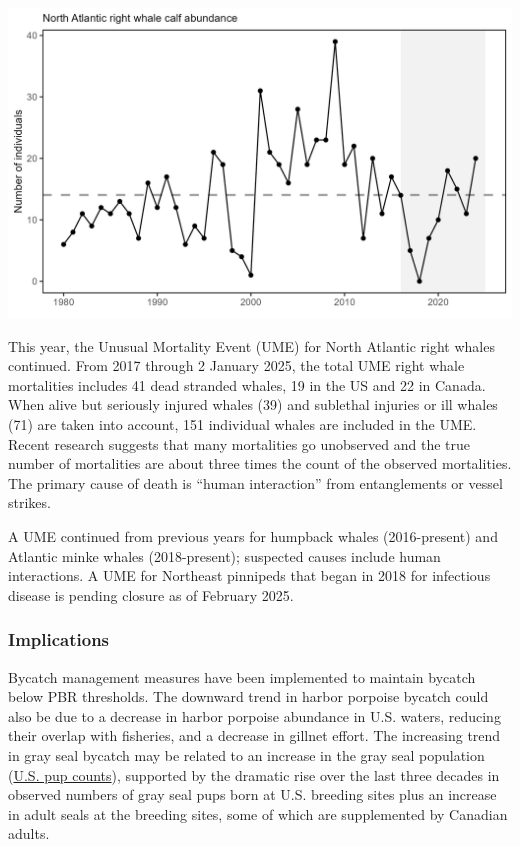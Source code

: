 \documentclass[
  10pt,
]{article}
\let\origfigure\figure
\let\endorigfigure\endfigure
\renewenvironment{figure}[1][2] {
    \expandafter\origfigure\expandafter[H]
} {
    \endorigfigure
}
\begin{document}
\begin{figure}

{\centering \includegraphics[width=6.5in]{images/BothReports/narw_calves_BothReports_2025-09-09} 

}

\caption{Number of North Atlantic right whale calf births, 1990 - 2022.}\label{fig:NARW-calf-abundance}
\end{figure}

This year, the Unusual Mortality Event (UME) for North Atlantic right whales continued. From 2017 through 2 January 2025, the total UME right whale mortalities includes 41 dead stranded whales, 19 in the US and 22 in Canada. When alive but seriously injured whales (39) and sublethal injuries or ill whales (71) are taken into account, 151 individual whales are included in the UME. Recent research suggests that many mortalities go unobserved and the true number of mortalities are about three times the count of the observed mortalities. The primary cause of death is ``human interaction'' from entanglements or vessel strikes.

A UME continued from previous years for humpback whales (2016-present) and Atlantic minke whales (2018-present); suspected causes include human interactions. A UME for Northeast pinnipeds that began in 2018 for infectious disease is pending closure as of February 2025.

\subsubsection{Implications}\label{implications-5}

Bycatch management measures have been implemented to maintain bycatch below PBR thresholds. The downward trend in harbor porpoise bycatch could also be due to a decrease in harbor porpoise abundance in U.S. waters, reducing their overlap with fisheries, and a decrease in gillnet effort. The increasing trend in gray seal bycatch may be related to an increase in the gray seal population (\href{https://noaa-edab.github.io/catalog/seal_pups.html}{U.S. pup counts}), supported by the dramatic rise over the last three decades in observed numbers of gray seal pups born at U.S. breeding sites plus an increase in adult seals at the breeding sites, some of which are supplemented by Canadian adults.
\end{document}
